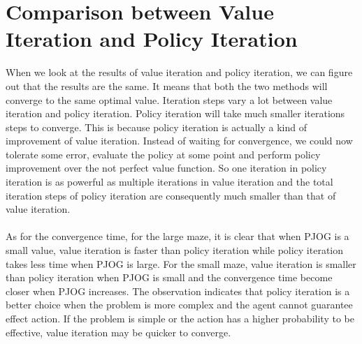 \documentclass[11pt]{article}
\begin{document}
\section{Comparison between Value Iteration and Policy Iteration}
When we look at the results of value iteration and policy iteration, we can figure out that the results are the same. It means that both the two methods will converge to the same optimal value. Iteration steps vary a lot between value iteration and policy iteration. Policy iteration will take much smaller iterations steps to converge. This is because policy iteration is actually a kind of improvement of value iteration. Instead of waiting for convergence, we could now tolerate some error, evaluate the policy at some point and perform policy improvement over the not perfect value function. So one iteration in policy iteration is as powerful as multiple iterations in value iteration and the total iteration steps of policy iteration are consequently much smaller than that of value iteration.\\
\\
As for the convergence time, for the large maze, it is clear that when PJOG is a small value, value iteration is faster than policy iteration while policy iteration takes less time when PJOG is large. For the small maze, value iteration is smaller than policy iteration when PJOG is small and the convergence time become closer when PJOG increases. The observation indicates that policy iteration is a better choice when the problem is more complex and the agent cannot guarantee effect action. If the problem is simple or the action has a higher probability to be effective, value iteration may be quicker to converge.
\end{document}
